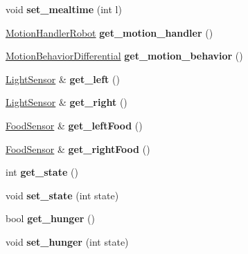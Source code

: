 \begin{DoxyCompactItemize}
void {\bfseries set\+\_\+mealtime} (int l)
\item 
\mbox{\label{class_robot_a77d37cf0058d18b7f633202e8c1bf814}} 
\mbox{\hyperlink{class_motion_handler_robot}{Motion\+Handler\+Robot}} {\bfseries get\+\_\+motion\+\_\+handler} ()
\item 
\mbox{\label{class_robot_ab45bf3c6fdafcd14cdbdb2a8e3f558b8}} 
\mbox{\hyperlink{class_motion_behavior_differential}{Motion\+Behavior\+Differential}} {\bfseries get\+\_\+motion\+\_\+behavior} ()
\item 
\mbox{\label{class_robot_a2573232c08bd4ec5d019d6711efa8bb3}} 
\mbox{\hyperlink{class_light_sensor}{Light\+Sensor}} \& {\bfseries get\+\_\+left} ()
\item 
\mbox{\label{class_robot_a31c14e5da0474e3c541a3065c7326b90}} 
\mbox{\hyperlink{class_light_sensor}{Light\+Sensor}} \& {\bfseries get\+\_\+right} ()
\item 
\mbox{\label{class_robot_ab68e3f017ae8d15068588958a1a09293}} 
\mbox{\hyperlink{class_food_sensor}{Food\+Sensor}} \& {\bfseries get\+\_\+left\+Food} ()
\item 
\mbox{\label{class_robot_a81732c5948f81a7244fa5b57b5d5174d}} 
\mbox{\hyperlink{class_food_sensor}{Food\+Sensor}} \& {\bfseries get\+\_\+right\+Food} ()
\item 
\mbox{\label{class_robot_a8464d9f4eda0441f31ced4eb452a472c}} 
int {\bfseries get\+\_\+state} ()
\item 
\mbox{\label{class_robot_a0c1e561824713bfd654873a69a7b2bae}} 
void {\bfseries set\+\_\+state} (int state)
\item 
\mbox{\label{class_robot_aacdc924197b130a93046168cc31933a8}} 
bool {\bfseries get\+\_\+hunger} ()
\item 
\mbox{\label{class_robot_ac9ba3c8bdb32cf84611e82ef4fc7f5a1}} 
void {\bfseries set\+\_\+hunger} (int state)
\item 
\mbox{\label{class_robot_a8cacd9eb01d98a862e7e744e2855a491}} 

\end{DoxyCompactItemize}
